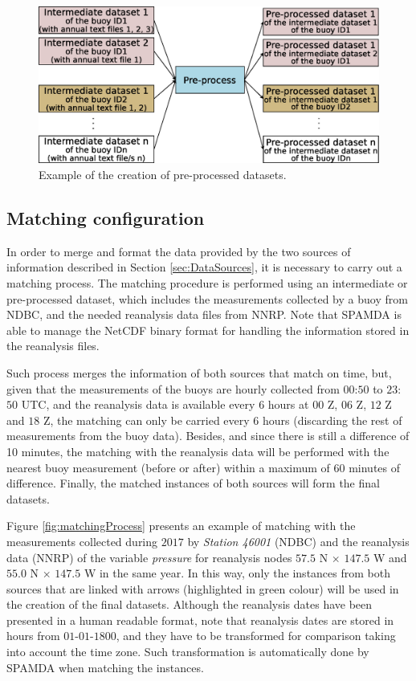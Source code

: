 \documentclass[energies,article,submit,moreauthors,pdftex]{Definitions/mdpi}
\begin{document}
				\begin{figure}[H]
					\centering
					\includegraphics[scale=0.36]{figures/FigurePreprocess.eps}
					\caption{Example of the creation of pre-processed datasets.}
					\label{fig:preprocess}
				\end{figure}
				
				
			\subsection{Matching configuration}
			\label{sec:matching_conf}
			
				In order to merge and format the data provided by the two sources of information described in Section \ref{sec:DataSources}, it is necessary to carry out a matching process. The matching procedure is performed using an intermediate or pre-processed dataset, which includes the measurements collected by a buoy from NDBC, and the needed reanalysis data files from NNRP. Note that SPAMDA is able to manage the NetCDF binary format for handling the information stored in the reanalysis files.
				
				Such process merges the information of both sources that match on time, but, given that the measurements of the buoys are hourly collected from $00$:$50$ to $23$:$50$ UTC, and the reanalysis data is available every $6$ hours at $00$ Z, $06$ Z, $12$ Z and $18$ Z, the matching can only be carried every $6$ hours (discarding the rest of measurements from the buoy data). Besides, and since there is still a difference of 10 minutes, the matching with the reanalysis data will be performed with the nearest buoy measurement (before or after) within a maximum of 60 minutes of difference. Finally, the matched instances of both sources will form the final datasets.
				
				Figure \ref{fig:matchingProcess} presents an example of matching with the measurements collected during $2017$ by \textit{Station 46001} (NDBC) and the reanalysis data (NNRP) of the variable \textit{pressure} for reanalysis nodes $57.5$ N $\times$ $147.5$ W and $55.0$ N $\times$ $147.5$ W in the same year. In this way, only the instances from both sources that are linked with arrows (highlighted in green colour) will be used in the creation of the final datasets. Although the reanalysis dates have been presented in a human readable format, note that reanalysis dates are stored in hours from $01$-$01$-$1800$, and they have to be transformed for comparison taking into account the time zone. Such transformation is automatically done by SPAMDA when matching the instances.
				
\end{document}
